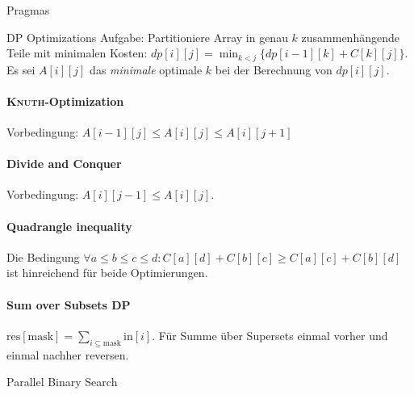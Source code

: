 \begin{algorithm}{Pragmas}
\end{algorithm}

\begin{algorithm}{DP Optimizations}
	Aufgabe: Partitioniere Array in genau $k$ zusammenhängende Teile mit minimalen Kosten:
	$dp[i][j] = \min_{k<j}\{dp[i-1][k]+C[k][j]\}$. Es sei $A[i][j]$ das \emph{minimale} optimale
	$k$ bei der Berechnung von $dp[i][j]$.
	
	\paragraph{\textsc{Knuth}-Optimization} Vorbedingung: $A[i - 1][j] \leq A[i][j] \leq A[i][j + 1]$
	
	
	\paragraph{Divide and Conquer}
	Vorbedingung: $A[i][j - 1] \leq A[i][j]$.
	
	
	\paragraph{Quadrangle inequality} Die Bedingung  $\forall a\leq b\leq c\leq d:
	C[a][d] + C[b][c] \geq C[a][c] + C[b][d]$ ist hinreichend für beide Optimierungen.
	
	\paragraph{Sum over Subsets DP} $\text{res}[\text{mask}]=\sum_{i\subseteq\text{mask}}\text{in}[i]$.
	Für Summe über Supersets  einmal vorher und einmal nachher reversen.
\end{algorithm}

\begin{algorithm}{Parallel Binary Search}
\end{algorithm}

